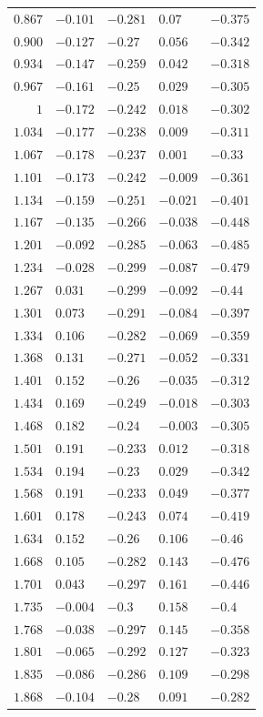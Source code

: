 \begin{table}[h]
\begin{tabular}{rllll}
$0.867$&$-0.101$&$-0.281$&$0.07$&$-0.375$\\
$0.900$&$-0.127$&$-0.27$&$0.056$&$-0.342$\\
$0.934$&$-0.147$&$-0.259$&$0.042$&$-0.318$\\
$0.967$&$-0.161$&$-0.25$&$0.029$&$-0.305$\\
$1$&$-0.172$&$-0.242$&$0.018$&$-0.302$\\
$1.034$&$-0.177$&$-0.238$&$0.009$&$-0.311$\\
$1.067$&$-0.178$&$-0.237$&$0.001$&$-0.33$\\
$1.101$&$-0.173$&$-0.242$&$-0.009$&$-0.361$\\
$1.134$&$-0.159$&$-0.251$&$-0.021$&$-0.401$\\
$1.167$&$-0.135$&$-0.266$&$-0.038$&$-0.448$\\
$1.201$&$-0.092$&$-0.285$&$-0.063$&$-0.485$\\
$1.234$&$-0.028$&$-0.299$&$-0.087$&$-0.479$\\
$1.267$&$0.031$&$-0.299$&$-0.092$&$-0.44$\\
$1.301$&$0.073$&$-0.291$&$-0.084$&$-0.397$\\
$1.334$&$0.106$&$-0.282$&$-0.069$&$-0.359$\\
$1.368$&$0.131$&$-0.271$&$-0.052$&$-0.331$\\
$1.401$&$0.152$&$-0.26$&$-0.035$&$-0.312$\\
$1.434$&$0.169$&$-0.249$&$-0.018$&$-0.303$\\
$1.468$&$0.182$&$-0.24$&$-0.003$&$-0.305$\\
$1.501$&$0.191$&$-0.233$&$0.012$&$-0.318$\\
$1.534$&$0.194$&$-0.23$&$0.029$&$-0.342$\\
$1.568$&$0.191$&$-0.233$&$0.049$&$-0.377$\\
$1.601$&$0.178$&$-0.243$&$0.074$&$-0.419$\\
$1.634$&$0.152$&$-0.26$&$0.106$&$-0.46$\\
$1.668$&$0.105$&$-0.282$&$0.143$&$-0.476$\\
$1.701$&$0.043$&$-0.297$&$0.161$&$-0.446$\\
$1.735$&$-0.004$&$-0.3$&$0.158$&$-0.4$\\
$1.768$&$-0.038$&$-0.297$&$0.145$&$-0.358$\\
$1.801$&$-0.065$&$-0.292$&$0.127$&$-0.323$\\
$1.835$&$-0.086$&$-0.286$&$0.109$&$-0.298$\\
$1.868$&$-0.104$&$-0.28$&$0.091$&$-0.282$\\

\end{tabular}
\end{table}
